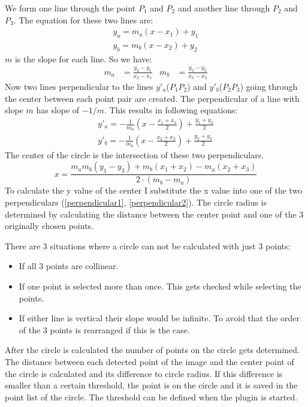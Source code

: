 We form one line through the point $P_1$ and $P_2$ and another line through $P_2$ and $P_3$. The equation for these two lines are:
\begin{align*}
	y_a = m_a(x-x_1) + y_1\\
	y_b = m_b(x-x_2) + y_2
\end{align*}
$m$ is the slope for each line. So we have:
\begin{align}
	m_a& = \frac{y_2 - y_1}{x_2 - x_1}&
	m_b& = \frac{y_3 - y_2}{x_3 - x_2}
\end{align}
Now two lines perpendicular to the lines $y'_a$($P_1P_2$) and $y'_b$($P_2P_3$) going through the center between each point pair are created. The perpendicular of a line with slope $m$ has slope of $-1/m$. This results in following equations:
\begin{align}
	y'_a = -\frac{1}{m_a}(x-\frac{x_1 + x_2}{2}) + \frac{y_1 + y_2}{2}\label{perpendicular1}\\
	y'_b = -\frac{1}{m_b}(x-\frac{x_2 + x_3}{2}) + \frac{y_2 + y_3}{2}\label{perpendicular2}
\end{align}
The center of the circle is the intersection of these two perpendiculars. 
\begin{equation}
	x = \frac{m_am_b(y_1-y_3) + m_b(x_1+x_2) - m_a(x_2+x_3)}{2\cdot(m_b-m_a)}
\end{equation}
To calculate the y value of the center I substitute the x value into one of the two perpendiculars (\ref{perpendicular1}, \ref{perpendicular2}). The circle radius is determined by calculating the distance between the center point and one of the 3 originally chosen points.

There are 3 situations where a circle can not be calculated with just 3 points:
\begin{itemize}
	\item If all 3 points are collinear.
	\item If one point is selected more than once. This gets checked while selecting the points.
	\item If either line is vertical their slope would be infinite. To avoid that the order of the 3 points is rearranged if this is the case. 
\end{itemize}

After the circle is calculated the number of points on the circle gets determined. The distance between each detected point of the image and the center point of the circle is calculated and its difference to circle radius. If this difference is smaller than a certain threshold, the point is on the circle and it is saved in the point list of the circle. The threshold can be defined when the plugin is started.

